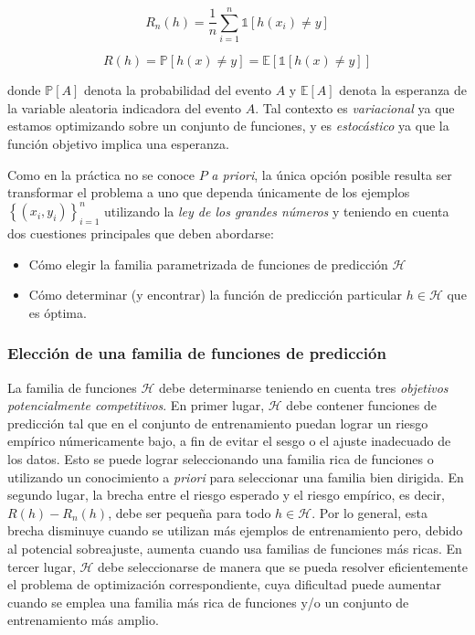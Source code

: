 \begin{equation}
\label{def: Riesgo empirico}
R_n(h) = \frac{1}{n}\sum\limits_{i=1}^{n}{\mathbb{1}\left[ h(x_i) \neq y \right]}
\end{equation}

\begin{equation}
\label{def: riesgo esperado}
R(h)=\mathbb{P}\left[h(x) \neq y \right] = \mathbb{E} \left[\mathbb{1} \left[h(x) \neq y \right] \right]
\end{equation}

donde $\mathbb{P}\left[A \right]$ denota la probabilidad del evento $A$  y $\mathbb{E}\left[A \right]$ denota la esperanza de la variable aleatoria indicadora del evento $A$. Tal contexto es \textit{variacional} ya que estamos optimizando sobre un conjunto de funciones, y es \textit{estoc\'astico} ya que la funci\'on objetivo implica una esperanza.

Como en la pr\'actica no se conoce $P$ \textit{a priori}, la \'unica opci\'on posible resulta ser transformar el problema a uno que dependa \'unicamente de los ejemplos $\left\lbrace\left(x_{i},y_{i}\right)\right\rbrace^{n}_{i=1}$ utilizando la \textit{ley de los grandes n\'umeros} y teniendo en cuenta dos cuestiones principales que deben abordarse: 

\begin{itemize}
	\item C\'omo elegir la familia parametrizada de funciones de predicci\'on $\mathcal{H}$
	\item C\'omo determinar (y encontrar) la funci\'on de predicci\'on particular $h \in \mathcal{H}$ que es \'optima.
\end{itemize}

\subsubsection{Elecci\'on de una familia de funciones de predicci\'on}

La familia de funciones $\mathcal{H}$ debe determinarse teniendo en cuenta tres \textit{objetivos potencialmente competitivos}. En primer lugar, $\mathcal{H}$ debe contener funciones de predicci\'on tal que en el conjunto de entrenamiento puedan lograr un riesgo emp\'irico n\'umericamente bajo, a fin de evitar el sesgo o el ajuste inadecuado de los datos. Esto se puede lograr seleccionando una familia rica de funciones o utilizando un conocimiento a \textit{priori} para seleccionar una familia bien dirigida. En segundo lugar, la brecha entre el riesgo esperado y el riesgo emp\'irico, es decir, $R(h) - R_n(h)$, debe ser peque\~na para todo $h \in \mathcal{H}$. Por lo general, esta brecha disminuye cuando se utilizan m\'as ejemplos de entrenamiento pero, debido al potencial sobreajuste, aumenta cuando usa familias de funciones m\'as ricas. En tercer lugar, $\mathcal{H}$ debe seleccionarse de manera que se pueda resolver eficientemente el problema de optimizaci\'on correspondiente, cuya dificultad puede aumentar cuando se emplea una familia m\'as rica de funciones y/o un conjunto de entrenamiento m\'as amplio.


